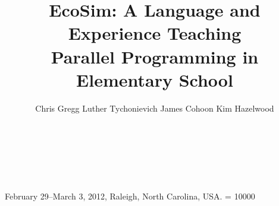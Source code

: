 \documentclass{sig-alternate}
\begin{document}
%
 {February 29--March 3, 2012, Raleigh, North Carolina, USA.} 
\widowpenalty = 10000

\title{EcoSim: A Language and Experience Teaching\\ Parallel Programming in Elementary School}
%
%
%
%
%

%
\author{
%
%
Chris Gregg
\qquad
Luther Tychonievich
\qquad 
James Cohoon
\qquad 
Kim Hazelwood
\and  %
       \\
       \\
       \\
}
\end{document}
